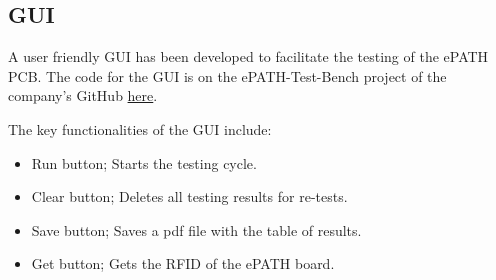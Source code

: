 \subsection{GUI}
A user friendly GUI has been developed to facilitate the testing of the ePATH PCB. The code for the GUI is on the ePATH-Test-Bench project of the company's GitHub \href{https://github.com/pathfinder-medical/ePATH-Test-Bench}{here}.

The key functionalities of the GUI include:
\begin{itemize}
\item Run button; Starts the testing cycle.
\item Clear button; Deletes all testing results for re-tests.
\item Save button; Saves a pdf file with the table of results.
\item Get button; Gets the RFID of the ePATH board.
\end{itemize}

